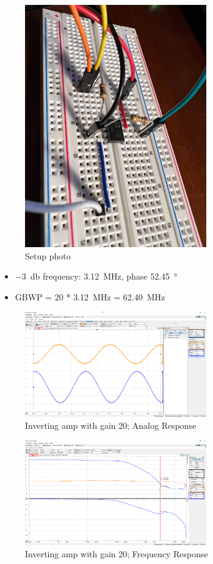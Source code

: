 \documentclass{article}
\begin{document}
	\begin{figure}[H]
	    \centering
	    \includegraphics[width=0.7\textwidth]{2d-photo}
	    \caption{Setup photo}
	\end{figure}
	
	\begin{itemize}
		\item \SI{-3}{\decibel} frequency: \SI{3.12}{\mega\hertz}, phase \SI{52.45}{\degree}
		\item GBWP = 20 * \SI{3.12}{\mega\hertz} = \SI{62.40}{\mega\hertz}
	\end{itemize}
	
	\begin{figure}[H]
	    \centering
	    \includegraphics[width=0.7\textwidth]{2d-1}
	    \caption{Inverting amp with gain 20; Analog Response}
	\end{figure}

	\begin{figure}[H]
	    \centering
	    \includegraphics[width=0.7\textwidth]{2d-2}
	    \caption{Inverting amp with gain 20; Frequency Response}
	\end{figure}
	
		
\end{document}
